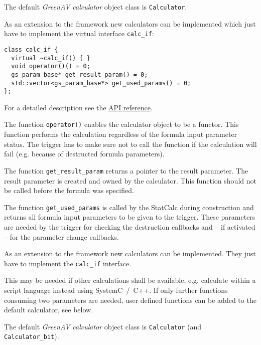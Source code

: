 The default {\em GreenAV calculator} object class is \lstinline|Calculator|. 


As an extension to the \GreenAV framework new calculators can be implemented which just have to implement the virtual interface \lstinline|calc_if|:
 
\noindent
\begin{minipage}{\textwidth}
\begin{lstlisting}[caption={Calculator interface calc\_if}]
class calc_if {
  virtual ~calc_if() { }
  void operator()() = 0;
  gs_param_base* get_result_param() = 0;
  std::vector<gs_param_base*> get_used_params() = 0;
};
\end{lstlisting}
\end{minipage}

For a detailed description see the \hyperlink{GAVDoxygenRef08target}{API reference}.

The function \lstinline|operator()| enables the calculator object to be a functor. This function performs the calculation regardless of the formula input parameter status. The trigger has to make sure not to call the function if the calculation will fail (e.g. because of destructed formula parameters).

The function \lstinline|get_result_param| returns a pointer to the result parameter. The result parameter is created and owned by the calculator. This function should not be called before the formula was specified.

The function \lstinline|get_used_params| is called by the StatCalc during construction and returns all formula input parameters to be given to the trigger. These parameters are needed by the trigger for checking the destruction callbacks and -- if activated -- for the parameter change callbacks.

 {
  As an extension to the \GreenAV framework new calculators can be implemented. They just have to implement the \lstinline|calc_if| interface.
  
  This may be needed if other calculations shall be available, e.g. calculate within a script language instead using SystemC~/~C++. If only further functions consuming two parameters are needed, user defined functions can be added to the default \GreenAV calculator, see below.
}


The default {\em GreenAV calculator} object class is \lstinline|Calculator| (and \lstinline|Calculator_bit|).

